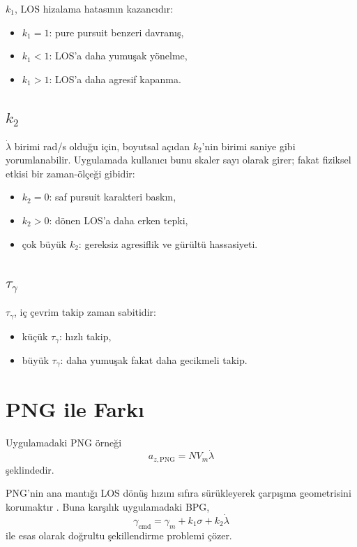 \documentclass[11pt,a4paper]{article}
\begin{document}
\(k_1\), LOS hizalama hatasının kazancıdır:
\begin{itemize}[leftmargin=1.2cm]
  \item \(k_1 = 1\): pure pursuit benzeri davranış,
  \item \(k_1 < 1\): LOS'a daha yumuşak yönelme,
  \item \(k_1 > 1\): LOS'a daha agresif kapanma.
\end{itemize}

\subsection{\texorpdfstring{\(k_2\)}{k2}}

\(\dot{\lambda}\) birimi \si{rad/s} olduğu için, boyutsal açıdan \(k_2\)'nin birimi saniye gibi yorumlanabilir. Uygulamada kullanıcı bunu skaler sayı olarak girer; fakat fiziksel etkisi bir zaman-ölçeği gibidir:
\begin{itemize}[leftmargin=1.2cm]
  \item \(k_2 = 0\): saf pursuit karakteri baskın,
  \item \(k_2 > 0\): dönen LOS'a daha erken tepki,
  \item çok büyük \(k_2\): gereksiz agresiflik ve gürültü hassasiyeti.
\end{itemize}

\subsection{\texorpdfstring{\(\tau_\gamma\)}{tau-gamma}}

\(\tau_\gamma\), iç çevrim takip zaman sabitidir:
\begin{itemize}[leftmargin=1.2cm]
  \item küçük \(\tau_\gamma\): hızlı takip,
  \item büyük \(\tau_\gamma\): daha yumuşak fakat daha gecikmeli takip.
\end{itemize}

\section{PNG ile Farkı}

Uygulamadaki PNG örneği
\begin{equation}
a_{z,\mathrm{PNG}} = N V_m \dot{\lambda}
\label{eq:png}
\end{equation}
şeklindedir.

PNG'nin ana mantığı LOS dönüş hızını sıfıra sürükleyerek çarpışma geometrisini korumaktır \cite{palumbo2010principles}. Buna karşılık uygulamadaki BPG,
\begin{equation}
\gamma_{\mathrm{cmd}} = \gamma_m + k_1\sigma + k_2\dot{\lambda}
\end{equation}
ile esas olarak doğrultu şekillendirme problemi çözer.
\end{document}
